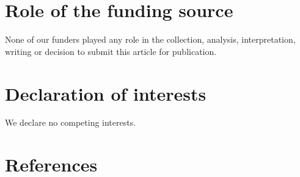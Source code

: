 \documentclass[
  12pt,
]{article}
\begin{document}
\hypertarget{role-of-the-funding-source}{%
\section*{Role of the funding source}\label{role-of-the-funding-source}}

None of our funders played any role in the collection, analysis, interpretation, writing or decision to submit this article for publication.

\hypertarget{declaration-of-interests}{%
\section*{Declaration of interests}\label{declaration-of-interests}}

We declare no competing interests.

\newpage

\hypertarget{references}{%
\section*{References}\label{references}}
\end{document}
